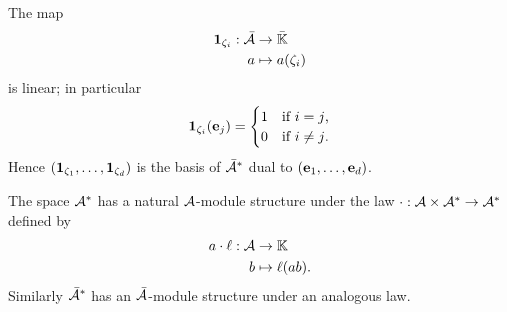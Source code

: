 The map
\begin{equation}
  \label{eq:8}
  \begin{aligned}
  \mathbf{1}_{\zeta_i} : \bar{\mathcal{A}} &\rightarrow \bar{\mathbb{K}}\\
  a &\mapsto a(\zeta_i)
  \end{aligned}
\end{equation}
is linear; in particular
\begin{equation}
  \label{eq:9}
  \mathbf{1}_{\zeta_i}(\mathbf{e}_j) =
  \begin{cases}
    1 &\text{if $i=j$,}\\
    0 &\text{if $i\ne j$.}
  \end{cases}
\end{equation}
Hence $(\mathbf{1}_{\zeta_1},\ldots,\mathbf{1}_{\zeta_d})$ is the basis
of $\bar{\mathcal{A}}^\ast$ dual to $(\mathbf{e}_1,\ldots,\mathbf{e}_d)$.

The space $\mathcal{A}^\ast$ has a natural $\mathcal{A}$-module
structure under the law
$\cdot:\mathcal{A}\times\mathcal{A}^\ast\rightarrow\mathcal{A}^\ast$ defined by
\begin{equation}
  \label{eq:10}
  \begin{aligned}
    a\cdot\ell : \mathcal{A} &\rightarrow \mathbb{K}\\
    b &\mapsto \ell(ab)
    \text{.}
  \end{aligned}
\end{equation}
Similarly $\bar{\mathcal{A}}^\ast$ has an $\bar{\mathcal{A}}$-module
structure under an analogous law.

